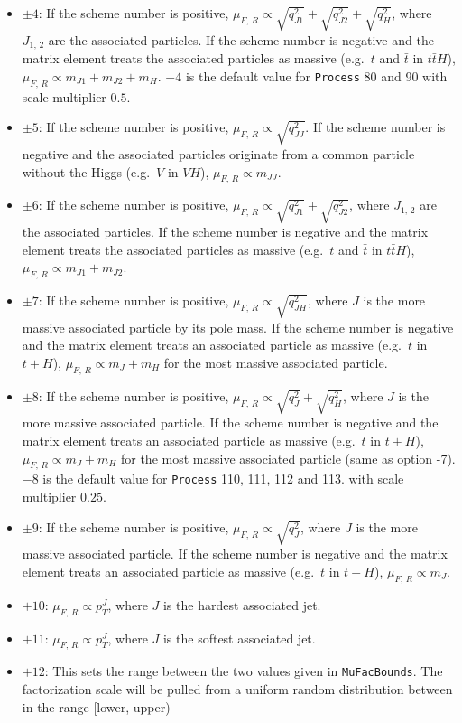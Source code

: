 \documentclass[aps,superscriptaddress,nofootinbib]{revtex4}
\newcommand{\eg}{e.g.~}
\begin{document}
\begin{itemize}
\begin{itemize}
		\item $\pm4$: If the scheme number is positive, $\mu_{F,\,R} \propto \sqrt{q^2_{J1}}+\sqrt{q^2_{J2}}+\sqrt{q^2_{H}}$, where $J_{1,\,2}$ are the associated particles. If the scheme number is negative and the matrix element treats the associated particles as massive (\eg $t$ and $\bar{t}$ in $t\bar{t}H$), $\mu_{F,\,R} \propto m_{J1}+m_{J2}+m_{H}$.  $-4$ is the default value for \verb|Process| 80 and 90 with scale multiplier $0.5$.
		\item $\pm5$: If the scheme number is positive, $\mu_{F,\,R} \propto \sqrt{q^2_{JJ}}$. If the scheme number is negative and the associated particles originate from a common particle without the Higgs (\eg $V$ in $VH$), $\mu_{F,\,R} \propto m_{JJ}$.
		\item $\pm6$: If the scheme number is positive, $\mu_{F,\,R} \propto \sqrt{q^2_{J1}}+\sqrt{q^2_{J2}}$, where $J_{1,\,2}$ are the associated particles. If the scheme number is negative and the matrix element treats the associated particles as massive (\eg $t$ and $\bar{t}$ in $t\bar{t}H$), $\mu_{F,\,R} \propto m_{J1}+m_{J2}$.
		\item $\pm7$: If the scheme number is positive, $\mu_{F,\,R} \propto \sqrt{q^2_{JH}}$, where $J$ is the more massive associated particle by its pole mass. If the scheme number is negative and the matrix element treats an associated particle as massive (\eg $t$ in $t+H$), $\mu_{F,\,R} \propto m_{J}+m_{H}$ for the most massive associated particle.
		\item $\pm8$: If the scheme number is positive, $\mu_{F,\,R} \propto \sqrt{q^2_{J}}+\sqrt{q^2_{H}}$, where $J$ is the more massive associated particle. If the scheme number is negative and the matrix element treats an associated particle as massive (\eg $t$ in $t+H$), $\mu_{F,\,R} \propto m_{J}+m_{H}$ for the most massive associated particle (same as option -7).  $-8$ is the default value for \verb|Process| 110, 111, 112 and 113. with scale multiplier $0.25$.
		\item $\pm9$: If the scheme number is positive, $\mu_{F,\,R} \propto \sqrt{q^2_{J}}$, where $J$ is the more massive associated particle. If the scheme number is negative and the matrix element treats an associated particle as massive (\eg $t$ in $t+H$), $\mu_{F,\,R} \propto m_{J}$.
		\item $+10$: $\mu_{F,\,R} \propto p_T^J$, where $J$ is the hardest associated jet.
		\item $+11$: $\mu_{F,\,R} \propto p_T^J$, where $J$ is the softest associated jet.
    \item $+12$: This sets the range between the two values given in \verb|MuFacBounds|. The factorization scale will be pulled from a uniform random distribution between in the range [lower, upper)
	\end{itemize}
\end{itemize}
\end{document}

